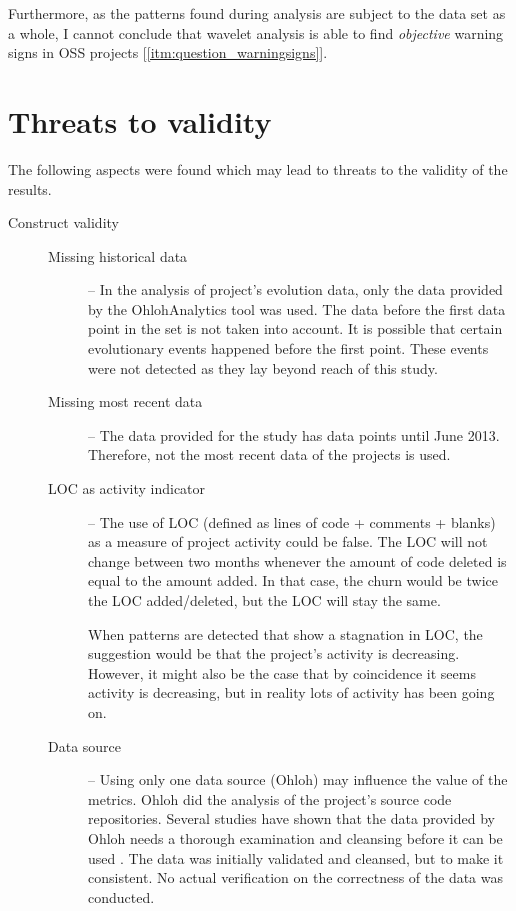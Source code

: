 Furthermore, as the patterns found during analysis are subject to the data set
as a whole, I cannot conclude that wavelet analysis is able to find
\textit{objective} warning signs in OSS projects
[\ref{itm:question_warningsigns}].

\section{Threats to validity}
The following aspects were found which may lead to threats to the validity of
the results.

\begin{description}
	\item[Construct validity] \hfill
	
	\begin{description}
		\item[\rm{Missing historical data}] -- In the analysis of project's
			evolution data, only the data provided by the OhlohAnalytics tool
			\cite{ohlohanalytics, bruntink2013} was used.
			The data before the first data point in the set is not taken into account. It
			is possible that certain evolutionary events happened before the first point.
			These events were not detected as they lay beyond reach of this study.

		\item[\rm{Missing most recent data}] -- The data provided for the study has
			data points until June 2013. Therefore, not the most recent data of the
			projects is used.

		\item[\rm{LOC as activity indicator}] -- The use of LOC (defined as
			lines of code + comments + blanks) as a measure of project activity could be
			false. The LOC will not change between two months whenever the amount of code
			deleted is equal to the amount added. In that case, the churn would be twice
			the LOC added/deleted, but the LOC will stay the same.

			When patterns are detected that show a stagnation in LOC, the suggestion
			would be that the project's activity is decreasing. However, it might also
			be the case that by coincidence it seems activity is decreasing, but in
			reality lots of activity has been going on.

		\item[\rm{Data source}] -- Using only one data source (Ohloh) may
			influence the value of the metrics. Ohloh did the analysis of the project's
			source code repositories. Several studies have shown that the data provided
			by Ohloh needs a thorough examination and cleansing before it can be used
			\cite{bruntink2013, ohlohanalytics, bruntink2014}. The data was initially
			validated and cleansed, but to make it consistent. No actual verification on
			the correctness of the data was conducted.
	\end{description}


\end{description}
